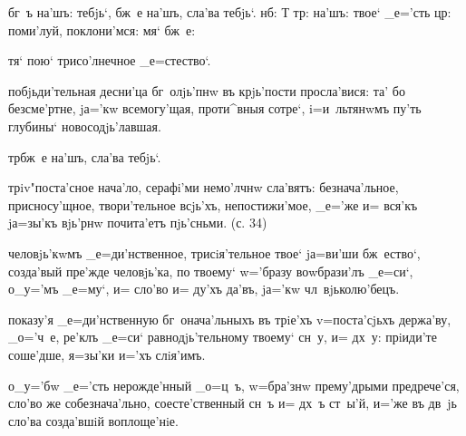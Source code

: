 
  бг~ъ на'шъ:      тебjь`, бж~е на'шъ, 
сла'ва тебjь`.  нб: Т  тр:  на'шъ:   твое` _е='сть цр:  поми'луй, 
     поклони'мся: 
    мя` бж~е:

          тя` пою` трисо'лнечное 
_е=стество`.



  побjьди'тельная десни'ца бг~олjь'пнw 
въ крjь'пости просла'вися: та' бо безсме'ртне, jа='кw 
всемогу'щая, проти^вныя сотре`, i=и~льтянwмъ пу'ть 
глубины` новосодjь'лавшая.

  тр бж~е на'шъ, сла'ва 
тебjь`.

 трiv"поста'сное нача'ло, серафi'ми немо'лчнw 
сла'вятъ: безнача'льное, присносу'щное, твори'тельное 
всjь'хъ, непостижи'мое, _е='же и= вся'къ jа=зы'къ вjь'рнw 
почита'етъ пjь'сньми. (с. 34)

 человjь'кwмъ _е=ди'нственное, трисiя'тельное твое` 
jа=ви'ши бж~ество`, созда'вый пре'жде человjь'ка, по 
твоему` w='бразу воwбрази'лъ _е=си`, о_у='мъ _е=му`, и= 
сло'во и= ду'хъ да'въ, jа='кw чл~вjьколю'бецъ.

  показу'я _е=ди'нственную 
бг~онача'льныхъ въ трiе'хъ v=поста'сjьхъ держа'ву, 
_о='ч~е, ре'клъ _е=си` равнодjь'тельному твоему` сн~у, и= 
дх~у: прiиди'те соше'дше, я=зы'ки и='хъ слiя'имъ.

    о_у='бw _е='сть 
нерожде'нный _о=ц~ъ, w=бра'знw прему'дрыми предрече'ся, 
сло'во же собезнача'льно, соесте'ственный сн~ъ и= дх~ъ 
ст~ы'й, и='же въ дв~jь сло'ва созда'вшiй воплоще'нiе.

